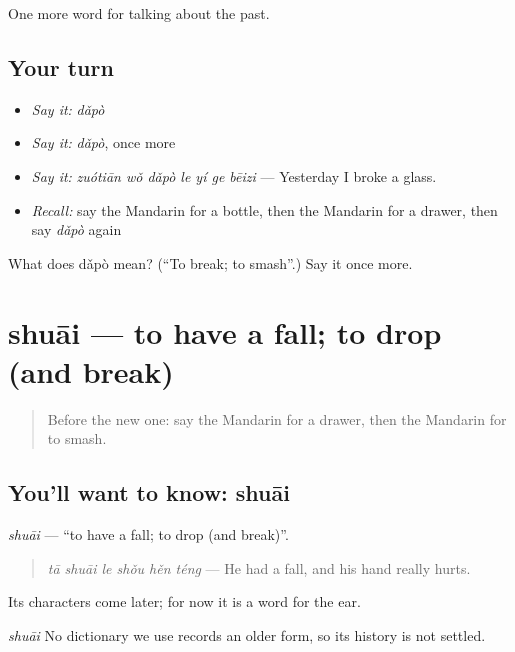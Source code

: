 \begin{grammarlens}[title={What you've built}]
One more word for talking about the past.
\end{grammarlens}

\subsection*{Your turn}
\begin{itemize}
\raggedright
  \item \emph{Say it:} \emph{dǎpò}
  \item \emph{Say it:} \emph{dǎpò}, once more
  \item \emph{Say it:} \emph{zuótiān wǒ dǎpò le yí ge bēizi} — Yesterday I broke a glass.
  \item \emph{Recall:} say the Mandarin for a bottle, then the Mandarin for a drawer, then say \emph{dǎpò} again
\end{itemize}

\begin{tcolorbox}[breakable,colback=teal!4,colframe=teal!35!black,title={Before you move on}]
What does dǎpò mean? (\textquotedblleft{}To break; to smash\textquotedblright{}.) Say it once more.
\end{tcolorbox}
\section[shuāi]{shuāi — to have a fall; to drop (and break)}

\label{lesson:ZH-C187-shuai}



\begin{quote}
Before the new one: say the Mandarin for a drawer, then the Mandarin for to smash.
\end{quote}

\subsection*{You'll want to know: shuāi}
\emph{shuāi} — \textquotedblleft{}to have a fall; to drop (and break)\textquotedblright{}.

\begin{quote}
\emph{tā shuāi le shǒu hěn téng} — He had a fall, and his hand really hurts.
\end{quote}

Its characters come later; for now it is a word for the ear.

\begin{cousinweb}
\emph{shuāi} No dictionary we use records an older form, so its history is not settled.
\end{cousinweb}

